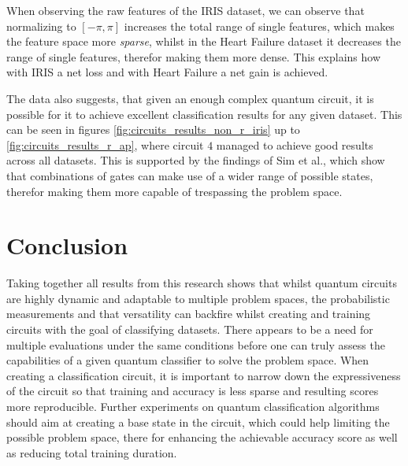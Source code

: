 When observing the raw features of the IRIS dataset, we can observe that normalizing to $[-\pi,\pi]$ increases the total range of single features, which makes the feature space more \emph{sparse}, whilst in the Heart Failure dataset it decreases the range of single features, therefor making them more dense. This explains how with IRIS a net loss and with Heart Failure a net gain is achieved. \par
The data also suggests, that given an enough complex quantum circuit, it is possible for it to achieve excellent classification results for any given dataset. This can be seen in figures \ref{fig:circuits_results_non_r_iris} up to \ref{fig:circuits_results_r_ap}, where circuit $4$ managed to achieve good results across all datasets. This is supported by the findings of Sim et al.\cite{sim_expressibility_2019}, which show that combinations of gates can make use of a wider range of possible states, therefor making them more capable of trespassing the problem space.
\clearpage
\section{Conclusion}
Taking together all results from this research shows that whilst quantum circuits are highly dynamic and adaptable to multiple problem spaces, the probabilistic measurements and that versatility can backfire whilst creating and training circuits with the goal of classifying datasets. There appears to be a need for multiple evaluations under the same conditions before one can truly assess the capabilities of a given quantum classifier to solve the problem space. When creating a classification circuit, it is important to narrow down the expressiveness of the circuit so that training and accuracy is less sparse and resulting scores more reproducible. Further experiments on quantum classification algorithms should aim at creating a base state in the circuit, which could help limiting the possible problem space, there for enhancing the achievable accuracy score as well as reducing total training duration.




